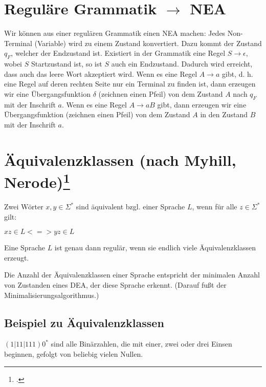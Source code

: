 \documentclass{lehramt-informatik-haupt}
\begin{document}
%

\section{Reguläre Grammatik $\rightarrow$ NEA}

Wir können aus einer regulären Grammatik einen NEA machen: Jedes
Non-Terminal (Variable) wird zu einem Zustand konvertiert. Dazu kommt
der Zustand $q_{F}$, welcher der Endzustand ist. Existiert in der
Grammatik eine Regel $S \rightarrow \epsilon$, wobei $S$ Startzustand
ist, so ist $S$ auch ein Endzustand. Dadurch wird erreicht, dass auch
das leere Wort akzeptiert wird. Wenn es eine Regel $A \rightarrow a$
gibt, d. h. eine Regel auf deren rechten Seite nur ein Terminal zu
finden ist, dann erzeugen wir eine Übergangsfunktion $\delta$ (zeichnen
einen Pfeil) von dem Zustand $A$ nach $q_{F}$ mit der Inschrift $a$.
Wenn es eine Regel $A\rightarrow aB$ gibt, dann erzeugen wir eine
Übergangsfunktion (zeichnen einen Pfeil) von dem Zustand $A$ in den
Zustand $B$ mit der Inschrift $a$.

%

\section{Äquivalenzklassen (nach Myhill, Nerode)\footcite{theo:fs:}}

Zwei Wörter $x, y \in \Sigma^*$ sind äquivalent bzgl. einer Sprache $L$,
wenn für alle $z \in Σ^*$ gilt:

$xz \in L <=> yz \in L$

Eine Sprache $L$ ist genau dann regulär, wenn sie endlich viele
Äquivalenzklassen erzeugt.

Die Anzahl der Äquivalenzklassen einer Sprache entspricht der
minimalen Anzahl von Zustanden eines DEA, der diese Sprache
erkennt. (Darauf fußt der Minimalisierungsalgorithmus.)

\subsection{Beispiel zu Äquivalenzklassen}

$(1|11|111)0^*$ sind alle Binärzahlen, die mit einer, zwei oder drei
Einsen beginnen, gefolgt von beliebig vielen Nullen.
\end{document}
